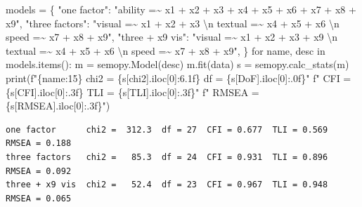 \documentclass[
  letterpaper,
  10pt,
  twoside,
  openright,
  numbers=noenddot,
  chapterprefix=true]{scrbook}
\newenvironment{Shaded}{}{}
\newcommand{\BuiltInTok}[1]{\textcolor[rgb]{0.84,0.23,0.29}{#1}}
\newcommand{\CharTok}[1]{\textcolor[rgb]{0.01,0.18,0.38}{#1}}
\newcommand{\ControlFlowTok}[1]{\textcolor[rgb]{0.84,0.23,0.29}{#1}}
\newcommand{\DecValTok}[1]{\textcolor[rgb]{0.00,0.36,0.77}{#1}}
\newcommand{\KeywordTok}[1]{\textcolor[rgb]{0.84,0.23,0.29}{#1}}
\newcommand{\NormalTok}[1]{\textcolor[rgb]{0.14,0.16,0.18}{#1}}
\newcommand{\OperatorTok}[1]{\textcolor[rgb]{0.14,0.16,0.18}{#1}}
\newcommand{\SpecialCharTok}[1]{\textcolor[rgb]{0.00,0.36,0.77}{#1}}
\newcommand{\SpecialStringTok}[1]{\textcolor[rgb]{0.01,0.18,0.38}{#1}}
\newcommand{\StringTok}[1]{\textcolor[rgb]{0.01,0.18,0.38}{#1}}
\begin{document}
\label{check-hs-compare}
\begin{Shaded}
\begin{Highlighting}[]
\NormalTok{models }\OperatorTok{=}\NormalTok{ \{}
    \StringTok{"one factor"}\NormalTok{:     }\StringTok{"ability =\textasciitilde{} x1 + x2 + x3 + x4 + x5 + x6 + x7 + x8 + x9"}\NormalTok{,}
    \StringTok{"three factors"}\NormalTok{:  }\StringTok{"visual =\textasciitilde{} x1 + x2 + x3 }\CharTok{\textbackslash{}n}\StringTok{ textual =\textasciitilde{} x4 + x5 + x6 }\CharTok{\textbackslash{}n}\StringTok{ speed =\textasciitilde{} x7 + x8 + x9"}\NormalTok{,}
    \StringTok{"three + x9 vis"}\NormalTok{: }\StringTok{"visual =\textasciitilde{} x1 + x2 + x3 + x9 }\CharTok{\textbackslash{}n}\StringTok{ textual =\textasciitilde{} x4 + x5 + x6 }\CharTok{\textbackslash{}n}\StringTok{ speed =\textasciitilde{} x7 + x8 + x9"}\NormalTok{,}
\NormalTok{\}}
\ControlFlowTok{for}\NormalTok{ name, desc }\KeywordTok{in}\NormalTok{ models.items():}
\NormalTok{    m }\OperatorTok{=}\NormalTok{ semopy.Model(desc)}
\NormalTok{    m.fit(data)}
\NormalTok{    s }\OperatorTok{=}\NormalTok{ semopy.calc\_stats(m)}
    \BuiltInTok{print}\NormalTok{(}\SpecialStringTok{f"}\SpecialCharTok{\{}\NormalTok{name}\SpecialCharTok{:15\}}\SpecialStringTok{ chi2 = }\SpecialCharTok{\{}\NormalTok{s[}\StringTok{\textquotesingle{}chi2\textquotesingle{}}\NormalTok{]}\SpecialCharTok{.}\NormalTok{iloc[}\DecValTok{0}\NormalTok{]}\SpecialCharTok{:6.1f\}}\SpecialStringTok{  df = }\SpecialCharTok{\{}\NormalTok{s[}\StringTok{\textquotesingle{}DoF\textquotesingle{}}\NormalTok{]}\SpecialCharTok{.}\NormalTok{iloc[}\DecValTok{0}\NormalTok{]}\SpecialCharTok{:.0f\}}\SpecialStringTok{"}
          \SpecialStringTok{f"  CFI = }\SpecialCharTok{\{}\NormalTok{s[}\StringTok{\textquotesingle{}CFI\textquotesingle{}}\NormalTok{]}\SpecialCharTok{.}\NormalTok{iloc[}\DecValTok{0}\NormalTok{]}\SpecialCharTok{:.3f\}}\SpecialStringTok{  TLI = }\SpecialCharTok{\{}\NormalTok{s[}\StringTok{\textquotesingle{}TLI\textquotesingle{}}\NormalTok{]}\SpecialCharTok{.}\NormalTok{iloc[}\DecValTok{0}\NormalTok{]}\SpecialCharTok{:.3f\}}\SpecialStringTok{"}
          \SpecialStringTok{f"  RMSEA = }\SpecialCharTok{\{}\NormalTok{s[}\StringTok{\textquotesingle{}RMSEA\textquotesingle{}}\NormalTok{]}\SpecialCharTok{.}\NormalTok{iloc[}\DecValTok{0}\NormalTok{]}\SpecialCharTok{:.3f\}}\SpecialStringTok{"}\NormalTok{)}
\end{Highlighting}
\end{Shaded}

\begin{verbatim}
one factor      chi2 =  312.3  df = 27  CFI = 0.677  TLI = 0.569  RMSEA = 0.188
three factors   chi2 =   85.3  df = 24  CFI = 0.931  TLI = 0.896  RMSEA = 0.092
three + x9 vis  chi2 =   52.4  df = 23  CFI = 0.967  TLI = 0.948  RMSEA = 0.065
\end{verbatim}
\end{document}
